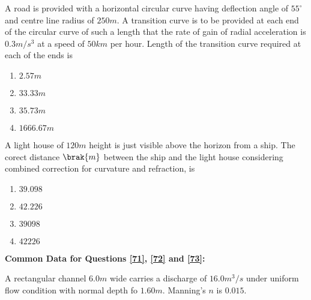\iffalse
\chapter{2008}
\author{AI24BTECH11015 - Harshvardhan Patidar}
\section{ce}
\fi

    \item A road is provided with a horizontal circular curve having deflection angle of  $55^{\circ}$ and centre line radius of $250 m$. A transition curve is to be provided at each end of the circular curve of such a length that the rate of gain of radial acceleration is $0.3 m/s^3$ at a speed of $50 km$ per hour. Length of the transition curve required at each of the ends is
        \begin{enumerate}
            \item $2.57m$
            \item $33.33m$
            \item $35.73m$
            \item $1666.67m$
        \end{enumerate}

    \item A light house of $120 m$ height is just visible above the horizon from a ship. The corect distance $\brak{m}$ between the ship and the light house considering combined correction for curvature and refraction, is
        \begin{enumerate}
            \item $39.098$
            \item $42.226$
            \item $39098$
            \item $42226$
        \end{enumerate}


            \item[] \textbf{Common Data for Questions \ref{71}, \ref{72} and \ref{73}:}
             
            A rectangular channel $6.0 m$ wide carries a discharge of $16.0 m^3 / s$ under uniform flow condition with normal depth fo $1.60 m$. Manning's $n$ is $0.015$.

